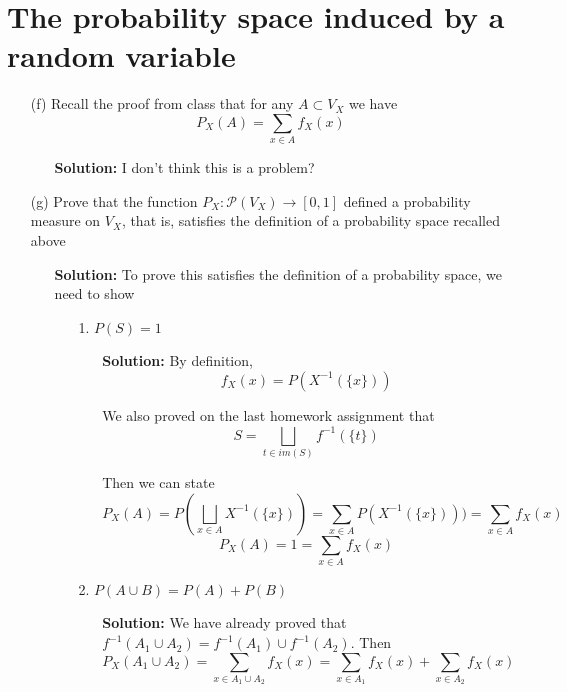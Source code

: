 \documentclass[hidelinks]{article}
\begin{document}
\section{The probability space induced by a random variable}
\begin{itemize}
    \item[(f)] Recall the proof from class that for any $A \subset V_X$ we have $$P_X(A) = \sum_{x \in A} f_X(x)$$ 
   \begin{itemize}
       \item[ ] \textbf{Solution:} I don't think this is a problem?
   \end{itemize}
    \item[(g)] Prove that the function $P_X: \mathcal{P}(V_X) \rightarrow [0, 1]$ defined a probability measure on $V_X$, that is, satisfies the definition of a probability space recalled above 
   \begin{itemize}
       \item[ ] \textbf{Solution:} To prove this satisfies the definition of a probability space, we need to show 
       \begin{itemize}
            \item[1.] $P(S) = 1$
            \begin{itemize}
                \item[ ] \textbf{Solution: }By definition,  
                \[
                    f_X(x) = P(X^{-1}(\{x\})) 
                \]
                \item[ ] We also proved on the last homework assignment that 
                \[
                    S = \bigsqcup_{t \in im(S)} f^{-1}(\{t\})
                \]
            \item[ ] Then we can state 
                \[
                    P_X(A) = P(\bigsqcup_{x \in A} X^{-1}(\{x\})) = \sum_{x \in A} P(X^{-1}(\{x\})))= \sum_{x \in A} f_X(x)
                \]
                \[
                P_X(A)  =  1 = \sum_{x \in A} f_X(x)
                \]
            \end{itemize}
            \item[2.] $P(A \cup B) = P(A) + P(B)$
           \begin{itemize}
               \item[ ] \textbf{Solution: }We have already proved that $f^{-1}(A_1 \cup A_2) = f^{-1}(A_1) \cup f^{-1}(A_2)$. Then 
                \[
                    P_X(A_1 \cup A_2) =  \sum_{x \in A_1 \cup A_2} f_X(x) =  \sum_{x \in A_1} f_X(x) +  \sum_{x \in A_2} f_X(x)
                \]

\end{itemize}
\end{itemize}
\end{itemize}
\end{itemize}
\end{document}
